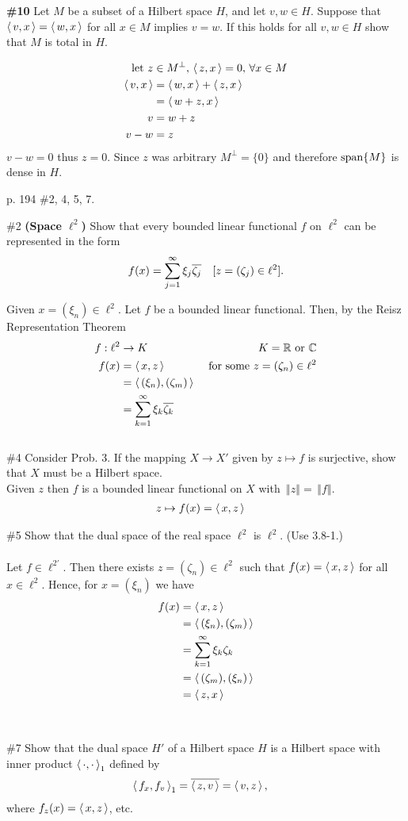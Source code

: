\documentclass[10pt,a4paper]{report}
\newcommand{\NORM}[1]{\,\left \Vert #1 \right \Vert}
\begin{document}
\noindent \textbf{\#10}  Let $M$ be a subset of a Hilbert space $H$, and let $v,w \in H$.  Suppose that $\left \langle\, v,x \,\right \rangle=\left \langle\, w,x \,\right \rangle$ for all $x \in M$ implies $v=w$.  If this holds for all $v,w \in H$ show that $M$ is total in $H$.

\begin{align*}
	\text{let } z &\in M^\perp, \, \left \langle\,  z, x \,\right \rangle = 0, \,  \forall x \in M\\
	\left \langle\, v,x \,\right \rangle &= \left \langle\, w,x \,\right \rangle + \left \langle\, z,x \,\right \rangle \\
	&= \left \langle\, w+z, x \,\right \rangle\\
	v &= w+z \\
	v-w &= z
\end{align*}$v-w = 0$ thus $z=0$.  Since $z$ was arbitrary $M^\perp = \{0\}$ and therefore $\operatorname{span}\{M\}$ is dense in $H$.

\newpage
\noindent p. 194 \#2, 4, 5, 7.

\noindent \#2 \textbf{(Space $\ell^2$)} Show that every bounded linear functional $f$ on $\ell^2$ can be represented in the form
\begin{align*}
	f(x) &= \sum_{j=1}^\infty \xi_j\overline{\zeta_j} & [z=(\zeta_j)\in \ell^2].
\end{align*}

Given $x = (\xi_n) \in \ell^2$. Let $f$ be a bounded linear functional.  Then, by the Reisz Representation Theorem
\begin{align*}
	f: \ell^2 &\to K & K = \mathbb{R} \text{ or } \mathbb{C}\\
	f(x) &= \left \langle\, x,z \,\right \rangle &\text{ for some } z = (\zeta_n) \in \ell^2 \\ 
	&= \left \langle\, (\xi_n),(\zeta_m) \,\right \rangle \\
	&= \sum_{k=1}^\infty \xi_k \overline{\zeta_k}
\end{align*}\\

\noindent \#4 Consider Prob. 3.  If the mapping $X \to X'$ given by $z \mapsto f$ is surjective, show that $X$ must be a Hilbert space.\\

Given $z$ then $f$ is a bounded linear functional on $X$ with $\NORM{z}=\NORM{f}$.
\begin{align*}
	z &\mapsto f(x)=\left \langle\, x,z \,\right \rangle
\end{align*}

\noindent \#5 Show that the dual space of the real space $\ell^2$ is $\ell^2$. (Use 3.8-1.)\\
\\
Let $f \in \ell^{2'}$.  Then there exists $z = (\zeta_n) \in \ell^2$ such that $f(x) = \left \langle\, x,z \,\right \rangle$ for all $x \in \ell^2$.  Hence, for $x=(\xi_n)$ we have
\begin{align*}
	f(x) &= \left \langle\, x,z \,\right \rangle \\
	&= \left \langle\, (\xi_n),(\zeta_m) \,\right \rangle \\
	&= \sum_{k=1}^\infty \xi_k \zeta_k \\
	&= \left \langle\, (\zeta_m), (\xi_n) \,\right \rangle \\
	&= \left \langle\, z,x \,\right \rangle
\end{align*}
\\
\\

\noindent \#7 Show that the dual space $H'$ of a Hilbert space $H$ is a Hilbert space with inner product $\left \langle\, \cdot, \cdot \,\right \rangle_1$ defined by
\begin{align*}
	\left \langle\, f_x,f_v \,\right \rangle_1 &= \overline{\left \langle\, z,v \,\right \rangle}= \left \langle\, v,z \,\right \rangle,
\end{align*}where $f_z(x) = \left \langle\, x,z \,\right \rangle$, etc.
\end{document}
